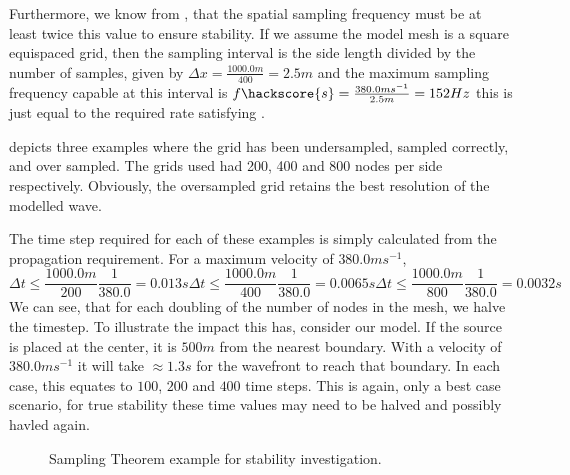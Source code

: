 Furthermore, we know from , that the spatial sampling
frequency must be at least twice this value to ensure stability. If we assume
the model mesh is a square equispaced grid,
then the sampling interval is the side length divided by the number of samples,
given by $\Delta x = \frac{1000.0m}{400} = 2.5m$ and the maximum sampling
frequency capable at this interval is
$f\hackscore{s}=\frac{380.0ms^{-1}}{2.5m}=152Hz$ this is just equal to the
required rate satisfying . 

 depicts three examples where the grid has been
undersampled, sampled correctly, and over sampled. The grids used had
200, 400 and 800 nodes per side respectively. Obviously, the oversampled grid
retains the best resolution of the modelled wave.

The time step required for each of these examples is simply calculated from
the propagation requirement. For a maximum velocity of $380.0ms^{-1}$,
\begin{subequations}
 \begin{equation}
  \Delta t \leq \frac{1000.0m}{200} \frac{1}{380.0} = 0.013s
 \end{equation}
 \begin{equation}
  \Delta t \leq \frac{1000.0m}{400} \frac{1}{380.0} = 0.0065s
 \end{equation}
 \begin{equation}
  \Delta t \leq \frac{1000.0m}{800} \frac{1}{380.0} = 0.0032s
 \end{equation}
\end{subequations}
We can see, that for each doubling of the number of nodes in the mesh, we halve
the timestep. To illustrate the impact this has, consider our model. If the
source is placed at the center, it is $500m$ from the nearest boundary. With a
velocity of $380.0ms^{-1}$ it will take $\approx1.3s$ for the wavefront to
reach that boundary. In each case, this equates to $100$,  $200$ and $400$ time
steps. This is again, only a best case scenario, for true stability these time
values may need to be halved and possibly havled again.

\begin{figure}[ht]
\centering
{}
\label{fig:ex07sampth}
\caption{Sampling Theorem example for stability
investigation.}
\end{figure}



 

